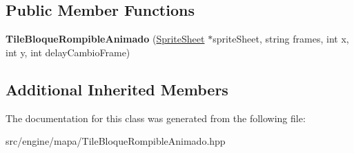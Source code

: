 \subsection*{Public Member Functions}
\begin{DoxyCompactItemize}
\item 
{\bfseries Tile\+Bloque\+Rompible\+Animado} (\hyperlink{class_sprite_sheet}{Sprite\+Sheet} $\ast$sprite\+Sheet, string frames, int x, int y, int delay\+Cambio\+Frame)\hypertarget{class_tile_bloque_rompible_animado_a0ea4c19744665353b927bbb4d38f0917}{}\label{class_tile_bloque_rompible_animado_a0ea4c19744665353b927bbb4d38f0917}

\end{DoxyCompactItemize}
\subsection*{Additional Inherited Members}


The documentation for this class was generated from the following file\+:\begin{DoxyCompactItemize}
\item 
src/engine/mapa/Tile\+Bloque\+Rompible\+Animado.\+hpp\end{DoxyCompactItemize}
